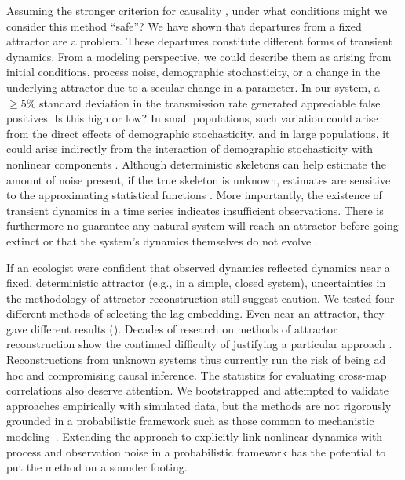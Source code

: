\documentclass[10pt,letterpaper]{article}
\begin{document}
Assuming the stronger criterion for causality \cite{Ye2015}, under what conditions might we consider this method ``safe''?
We have shown that departures from a fixed attractor are a problem.
These departures constitute different forms of transient dynamics.
From a modeling perspective, we could describe them as arising from initial conditions, process noise, demographic stochasticity, or a change in the underlying attractor due to a secular change in a parameter.
In our system, a $\geq5\%$ standard deviation in the transmission rate generated appreciable false positives.
Is this high or low?
In small populations, such variation could arise from the direct effects of demographic stochasticity, and in large populations, it could arise indirectly from the interaction of demographic stochasticity with nonlinear components \cite{Dalziel2016,Alonso2006}.
Although deterministic skeletons can help estimate the amount of noise present, if the true skeleton is unknown, estimates are sensitive to the approximating statistical functions \cite{Ellner1995}.
More importantly, the existence of transient dynamics in a time series indicates insufficient observations. 
There is furthermore no guarantee any natural system will reach an attractor before going extinct or that the system's dynamics themselves do not evolve \cite{Turchin2003}.

If an ecologist were confident that observed dynamics reflected dynamics near a fixed, deterministic attractor (e.g., in a simple, closed system), uncertainties in the methodology of attractor reconstruction still suggest caution.
We tested four different methods of selecting the lag-embedding.
Even near an attractor, they gave different results ().
Decades of research on methods of attractor reconstruction show the continued difficulty of justifying a particular approach \cite{Casdagli1991, Uzal2011, Nichkawde2013, Tajima2015, Sugihara1990}.
Reconstructions from unknown systems thus currently run the risk of being ad hoc and compromising causal inference.
The statistics for evaluating cross-map correlations also deserve attention.
We bootstrapped and attempted to validate approaches empirically with simulated data, but the methods are not rigorously grounded in a probabilistic framework such as those common to mechanistic modeling~\cite{HilbornMangel}.
Extending the approach to explicitly link nonlinear dynamics with process and observation noise in a probabilistic framework has the potential to put the method on a sounder footing.
\end{document}
